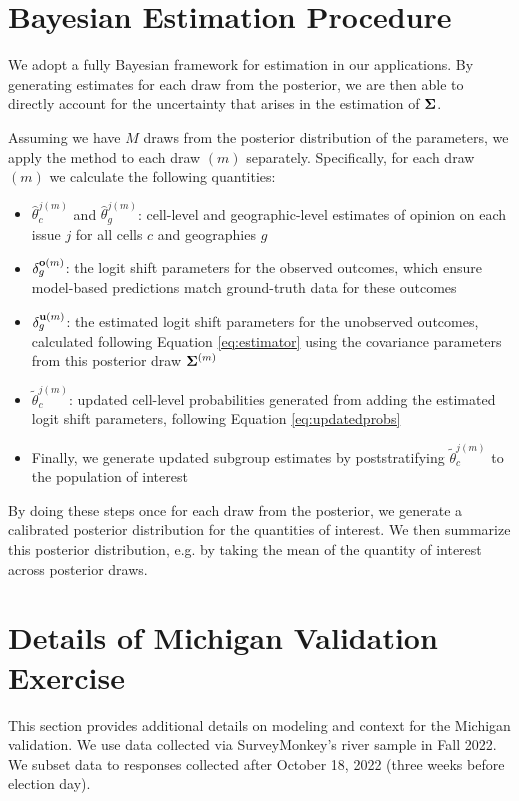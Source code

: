 



\section{Bayesian Estimation Procedure}
\label{apx:bayesest}
We adopt a fully Bayesian framework for estimation in our applications.
By generating estimates for each draw from the posterior, we are then able to directly account for the uncertainty that arises in the estimation of $\mathbf{\Sigma}$.

Assuming we have $M$ draws from the posterior distribution of the parameters, we apply the method to each draw $(m)$ separately. 
Specifically, for each draw $(m)$ we calculate the following quantities: 
\begin{itemize}
	\item $\hat{\theta}_c^{j(m)}$ and $\hat{\theta}_g^{j(m)}$: cell-level and geographic-level estimates of opinion on each issue $j$ for all cells $c$ and geographies $g$
	\item $\delta_g^{\mathbf{o}(m)}$: the logit shift parameters for the observed outcomes, which ensure model-based predictions match ground-truth data for these outcomes
	\item $\delta_g^{\mathbf{u}(m)}$: the estimated logit shift parameters for the unobserved outcomes, calculated following Equation \ref{eq:estimator} using the covariance parameters from this posterior draw $\mathbf{\Sigma}^{(m)}$
	\item $\tilde{\theta}_c^{j(m)}$: updated cell-level probabilities generated from adding the estimated logit shift parameters, following Equation \ref{eq:updatedprobs}
	\item Finally, we generate updated subgroup estimates by poststratifying $\tilde{\theta}_c^{j(m)}$ to the population of interest
\end{itemize}
By doing these steps once for each draw from the posterior, we generate a calibrated posterior distribution for the quantities of interest.
We then summarize this posterior distribution, e.g. by taking the mean of the quantity of interest across posterior draws. 

\clearpage
\section{Details of Michigan Validation Exercise}
\label{apx:modeling}


This section provides additional details on modeling and context for the Michigan validation.  We use data collected via SurveyMonkey's river sample in Fall 2022. We subset data to responses collected after October 18, 2022 (three weeks before election day). 


